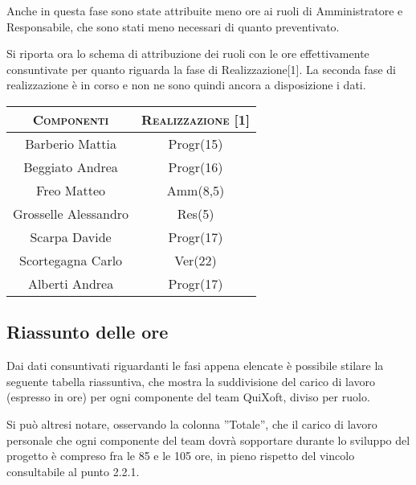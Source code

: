 \documentclass[11pt,a4paper]{article}
\begin{document}
Anche in questa fase sono state attribuite meno ore ai ruoli di Amministratore e Responsabile, che sono stati meno necessari di quanto preventivato.

Si riporta ora lo schema di attribuzione dei ruoli con le ore effettivamente consuntivate per quanto riguarda la fase di Realizzazione[1]. La seconda fase di realizzazione è in corso e non ne sono quindi ancora a disposizione i dati.
\\
\begin{center}
\begin{tabular}{|c||c|}
\hline
\textsc{Componenti} & \textsc{Realizzazione [1]} \\ \hline \hline
Barberio Mattia & Progr(15) \\ \hline
Beggiato Andrea & Progr(16) \\ \hline
Freo Matteo & Amm(8,5) \\ \hline
Grosselle Alessandro & Res(5) \\ \hline
Scarpa Davide & Progr(17) \\ \hline
Scortegagna Carlo & Ver(22) \\ \hline
Alberti Andrea & Progr(17) \\ \hline
\end{tabular}
\end{center}
\bigskip
\subsection{Riassunto delle ore}
Dai dati consuntivati riguardanti le fasi appena elencate è possibile stilare la seguente tabella riassuntiva, che mostra la suddivisione del carico di lavoro (espresso in ore) per ogni componente del team QuiXoft, diviso per ruolo.

Si può altresi notare, osservando la colonna ''Totale'', che il carico di lavoro personale che ogni componente del team dovrà sopportare durante lo sviluppo del progetto è compreso fra le 85 e le 105 ore, in pieno rispetto del vincolo consultabile al punto 2.2.1.
\end{document}
